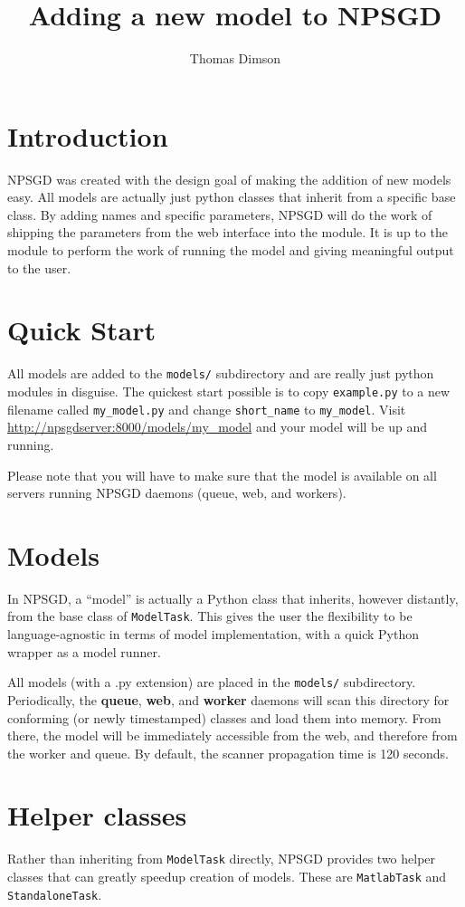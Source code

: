 \documentclass{article}
\title{Adding a new model to NPSGD}
\author{Thomas Dimson}
\newcommand{\mpath}[1]{\texttt{#1}}
\newcommand{\mclass}[1]{\texttt{#1}}
\begin{document}
\maketitle
\tableofcontents
\newpage

\section{Introduction}
NPSGD was created with the design goal of making the addition of new models
easy. All models are actually just python classes that inherit from a specific
base class. By adding names and specific parameters, NPSGD will do the work of
shipping the parameters from the web interface into the module. It is up to the
module to perform the work of running the model and giving meaningful output to
the user.

\section{Quick Start}
All models are added to the \mpath{models/} subdirectory and are really just python
modules in disguise. The quickest start possible is to copy \mpath{example.py} to a
new filename called \mpath{my\_model.py} and change \mpath{short\_name} to
\mpath{my\_model}. 
Visit \url{http://npsgdserver:8000/models/my_model} and your model will be up and running.

Please note that you will have to make sure that the model is available on all
servers running NPSGD daemons (queue, web, and workers).

\section{Models}
In NPSGD, a ``model'' is actually a Python class that inherits, however
distantly, from the base class of \mclass{ModelTask}. This gives the user the
flexibility to be language-agnostic in terms of model implementation, with a
quick Python wrapper as a model runner.

All models (with a .py extension) are placed in the \mpath{models/} subdirectory.
Periodically, the \textbf{queue}, \textbf{web},
and \textbf{worker} daemons will scan this directory for conforming (or newly
timestamped) classes and load them into memory. From there, the model will be
immediately accessible from the web, and therefore from the worker and queue. By
default, the scanner propagation time is 120 seconds.

\section{Helper classes}
\label{sec:helpers}
Rather than inheriting from \mclass{ModelTask} directly, NPSGD provides two
helper classes that can greatly speedup creation of models. These are
\mclass{MatlabTask} and \mclass{StandaloneTask}.
\end{document}
